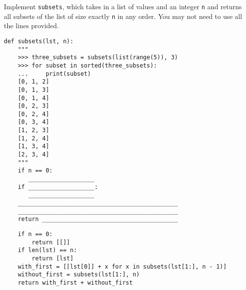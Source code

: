 \begin{blocksection}
\question Implement \lstinline$subsets$, which takes in a list of values and an
integer \lstinline$n$ and returns all subsets of the list of size exactly
\lstinline$n$ in any order. You may not need to use all the lines provided.

\begin{lstlisting}
def subsets(lst, n):
    """
    >>> three_subsets = subsets(list(range(5)), 3)
    >>> for subset in sorted(three_subsets):
    ...     print(subset)
    [0, 1, 2]
    [0, 1, 3]
    [0, 1, 4]
    [0, 2, 3]
    [0, 2, 4]
    [0, 3, 4]
    [1, 2, 3]
    [1, 2, 4]
    [1, 3, 4]
    [2, 3, 4]
    """
    if n == 0:
       ___________________
    if ___________________:
       ___________________
    ______________________________________________
    ______________________________________________
    return _______________________________________

\end{lstlisting}

\begin{solution}
\begin{lstlisting}
    if n == 0:
        return [[]]
    if len(lst) == n:
        return [lst]
    with_first = [[lst[0]] + x for x in subsets(lst[1:], n - 1)]
    without_first = subsets(lst[1:], n)
    return with_first + without_first
\end{lstlisting}
\end{solution}
\end{blocksection}
